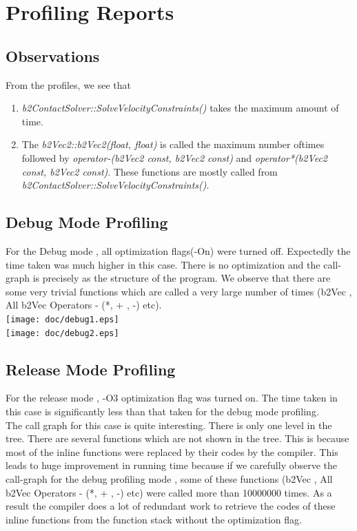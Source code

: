 \documentclass[a4paper,11pt]{report}
\begin{document}
\section{Profiling Reports}
\subsection{Observations}
From the profiles, we see that
\begin{enumerate}
  \item 
 \textit{b2ContactSolver::SolveVelocityConstraints()} takes the maximum amount of time.
 \item
  The \textit{b2Vec2::b2Vec2(float, float)} is called the maximum number oftimes followed by \textit{operator-(b2Vec2 const, b2Vec2 const)} and \textit{operator*(b2Vec2 const, b2Vec2 const)}. These functions are mostly called from \textit{b2ContactSolver::SolveVelocityConstraints()}.
\end{enumerate}

\subsection{Debug Mode Profiling}
For the Debug mode , all optimization flags(-On) were turned off. Expectedly the time taken was much higher in this case.
There is no optimization and the call-graph is precisely as the structure of the program. We observe that there are some very trivial functions which are called a very large number of times (b2Vec , All b2Vec Operators - (*, + , -) etc).\\
\texttt{[image: doc/debug1.eps]}\\
\texttt{[image: doc/debug2.eps]} \\

\subsection{Release Mode Profiling}
For the release mode , -O3 optimization flag was turned on. The time taken in this case is significantly less than that taken for the debug mode profiling.\\
The call graph for this case is quite interesting. There is only one level in the tree. There are several functions which are not shown in the tree. This is because most of the inline functions were replaced by their codes by the compiler. This leads to huge improvement in running time because if we carefully observe the call-graph for the debug profiling mode , some of these functions (b2Vec , All b2Vec Operators - (*, + , -) etc) were called more than 10000000 times. As a result the compiler does a lot of redundant work to  retrieve the codes of these inline functions from the function stack without the optimization flag.
\end{document}
